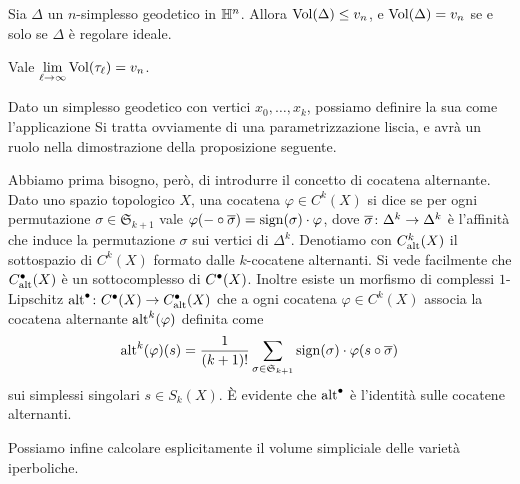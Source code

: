 \begin{theorem}
Sia $\Delta$ un $n$-simplesso geodetico in $\mathbb{H}^n$. Allora $\operatorname{Vol}(\Delta)\le v_n$, e $\operatorname{Vol}(\Delta)=v_n$ se e solo se $\Delta$ è regolare ideale.
\end{theorem}

\begin{theorem}
Vale $\lim\limits_{\ell\to\infty}\operatorname{Vol}(\tau_\ell)=v_n$.
\end{theorem}

Dato un simplesso geodetico con vertici $x_0,\ldots,x_k$, possiamo definire la sua  come l'applicazione
Si tratta ovviamente di una parametrizzazione liscia, e avrà un ruolo nella dimostrazione della proposizione seguente.

Abbiamo prima bisogno, però, di introdurre il concetto di cocatena alternante. Dato uno spazio topologico $X$, una cocatena $\varphi\in C^k(X)$ si dice  se per ogni permutazione $\sigma\in\mathfrak{S}_{k+1}$ vale $\varphi({-}\circ\overline{\sigma})=\operatorname{sign}(\sigma)\cdot\varphi$, dove $\map{\overline\sigma}{\Delta^k}{\Delta^k}$ è l'affinità che induce la permutazione $\sigma$ sui vertici di $\Delta^k$. Denotiamo con $C^k_{\operatorname{alt}}(X)$ il sottospazio di $C^k(X)$ formato dalle $k$-cocatene alternanti. Si vede facilmente che $C^\bullet_{\operatorname{alt}}(X)$ è un sottocomplesso di $C^\bullet(X)$. Inoltre esiste un morfismo di complessi $1$-Lipschitz $\map{\alt^\bul}{C^\bul(X)}{C^\bul_{\alt}(X)}$ che a ogni cocatena $\varphi\in C^k(X)$ associa la cocatena alternante $\operatorname{alt}^k(\varphi)$ definita come
\[
\operatorname{alt}^k(\varphi)(s)=\frac{1}{(k+1)!}\sum_{\sigma\in\mathfrak{S}_{k+1}}\operatorname{sign}(\sigma)\cdot\varphi(s\circ\overline\sigma)
\]
sui simplessi singolari $s\in S_k(X)$. È evidente che $\operatorname{alt}^\bullet$ è l'identità sulle cocatene alternanti.

Possiamo infine calcolare esplicitamente il volume simpliciale delle varietà iperboliche.


